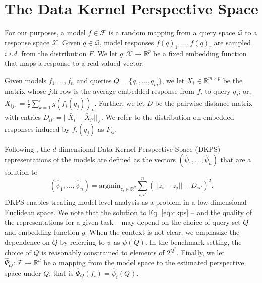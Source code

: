 \section{The Data Kernel Perspective Space}
For our purposes, a model $ f \in \mathcal{F} $ is a random mapping from a query space $ \mathcal{Q} $ to a response space $ \mathcal{X} $. 
Given $ q \in \mathcal{Q} $, model responses $ f(q)_{1}, \hdots, f(q)_{r} $ are sampled $ i.i.d. $ from the distribution $ F $.
We let $ g: \mathcal{X} \to \mathbb{R}^{p} $ be a fixed embedding function that maps a response to a real-valued vector.

Given models $ f_{1}, \hdots, f_{n} $ and queries $ Q = \{q_{1}, \hdots, q_{m}\} $,  we let $ \bar{X}_{i} \in \mathbb{R}^{m \times p} $ be the matrix whose $ j $th row is the average embedded response from $ f_{i} $ to query $ q_{j} $; or,  $\bar{X}_{ij\cdot} = \frac{1}{r} \sum_{k=1}^{r} g(f_{i}(q_{j}))_{k} $.
Further, we let $ D $ be the pairwise distance matrix with entries $ D_{ii'} = || \bar{X}_{i} - \bar{X}_{i'} ||_{F} $.
We refer to the distribution on embedded responses induced by $ f_{i}(q_{j}) $ as $ F_{ij} $.

Following \citep{aranyak}, the $d$-dimensional Data Kernel Perspective Space (DKPS) representations of the models are defined as the vectors $ (\widehat{\psi}_{1}, \hdots, \widehat{\psi}_{n}) $ that are a solution to
\begin{equation}
(\widehat{\psi}_{1}, \hdots, \widehat{\psi}_{n}) =    \text{argmin}_{z_i \in \mathbb{R}^d} 
    \sum_{i,i'}^{n}
    (
\lvert\lvert
z_i - z_{j} \rvert\rvert
 -
D_{ii'}
    )^2.
\label{eq:dkps}
\end{equation}
DKPS enables treating model-level analysis as a problem in a low-dimensional Euclidean space.
We note that the solution to Eq. \eqref{eq:dkps} -- and the quality of the representations for a given task -- may depend on the choice of query set $ Q $ and embedding function $ g $.
When the context is not clear, we emphasize the dependence on $ Q $ by referring to $ \psi $ as $ \psi(Q) $.
In the benchmark setting, the choice of $ Q $ is reasonably constrained to elements of $ 2^{Q^{*}} $.
Finally, we let $ \widehat{\Psi}_{Q}: \mathcal{F} \to \mathbb{R}^{d} $ be a mapping from the model space to the estimated perspective space under $ Q $; that is $ \widehat{\Psi}_{Q}(f_{i}) = \widehat{\psi}_{i}(Q) $.

